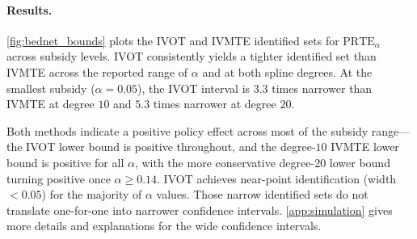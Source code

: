 \paragraph{Results.}
\cref{fig:bednet_bounds} plots the IVOT and IVMTE identified sets for $\text{PRTE}_\alpha$ across subsidy levels. IVOT consistently yields a tighter identified set than IVMTE across the reported range of $\alpha$ and at both spline degrees. At the smallest subsidy ($\alpha = 0.05$), the IVOT interval is $3.3$ times narrower than IVMTE at degree $10$ and $5.3$ times narrower at degree $20$.

Both methods indicate a positive policy effect across most of the subsidy range---the IVOT lower bound is positive throughout, and the degree-$10$ IVMTE lower bound is positive for all $\alpha$, with the more conservative degree-$20$ lower bound turning positive once $\alpha \geqslant 0.14$. IVOT achieves near-point identification (width $< 0.05$) for the majority of $\alpha$ values. Those narrow identified sets do not translate one-for-one into narrower confidence intervals. \cref{app:simulation} gives more details and explanations for the wide confidence intervals.
